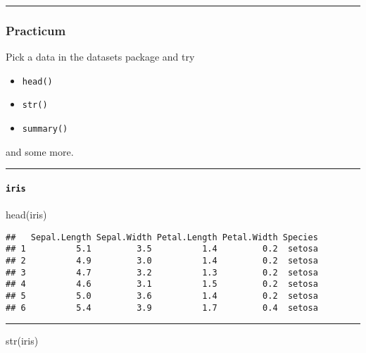 \documentclass[
]{article}
\newenvironment{Shaded}{\begin{snugshade}}{\end{snugshade}}
\newcommand{\FunctionTok}[1]{\textcolor[rgb]{0.00,0.00,0.00}{#1}}
\newcommand{\NormalTok}[1]{#1}
\providecommand{\tightlist}{%
  \setlength{\itemsep}{0pt}\setlength{\parskip}{0pt}}
\begin{document}
\begin{center}\rule{0.5\linewidth}{0.5pt}\end{center}

\hypertarget{practicum}{%
\subsubsection{Practicum}\label{practicum}}

Pick a data in the datasets package and try

\begin{itemize}
\tightlist
\item
  \texttt{head()}
\item
  \texttt{str()}
\item
  \texttt{summary()}
\end{itemize}

and some more.

\begin{center}\rule{0.5\linewidth}{0.5pt}\end{center}

\hypertarget{iris}{%
\paragraph{\texorpdfstring{\texttt{iris}}{iris}}\label{iris}}

\begin{Shaded}
\begin{Highlighting}[]
\FunctionTok{head}\NormalTok{(iris)}
\end{Highlighting}
\end{Shaded}

\begin{verbatim}
##   Sepal.Length Sepal.Width Petal.Length Petal.Width Species
## 1          5.1         3.5          1.4         0.2  setosa
## 2          4.9         3.0          1.4         0.2  setosa
## 3          4.7         3.2          1.3         0.2  setosa
## 4          4.6         3.1          1.5         0.2  setosa
## 5          5.0         3.6          1.4         0.2  setosa
## 6          5.4         3.9          1.7         0.4  setosa
\end{verbatim}

\begin{center}\rule{0.5\linewidth}{0.5pt}\end{center}

\begin{Shaded}
\begin{Highlighting}[]
\FunctionTok{str}\NormalTok{(iris)}
\end{Highlighting}
\end{Shaded}
\end{document}
